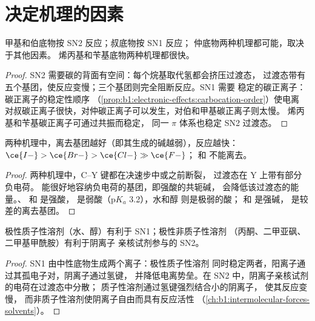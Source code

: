 \section{决定机理的因素}

\begin{proposition}[底物]\label{prop:b1:nucleophilic-substitution:substrate}
甲基和伯底物按 SN2 反应；叔底物按 SN1 反应；
仲底物两种机理都可能，取决于其他因素。
烯丙基和苄基底物两种机理都很快。
\end{proposition}

\begin{proof}
SN2 需要碳的背面有空间：每个烷基取代氢都会挤压过渡态，
过渡态带有五个基团，使反应变慢；三个基团则完全阻断反应。SN1 需要
稳定的碳正离子：碳正离子的稳定性顺序
（\cref{prop:b1:electronic-effects:carbocation-order}）使电离
对叔碳正离子很快，对仲碳正离子可以发生，对伯和甲基碳正离子则太慢。
烯丙基和苄基碳正离子可通过共振而稳定，
同一 $\pi$ 体系也稳定 SN2
过渡态。
\end{proof}

\begin{proposition}[离去基团]\label{prop:b1:nucleophilic-substitution:leaving-group}
两种机理中，离去基团越好（即其生成的碱越弱），反应越快：
$\ce{I-} > \ce{Br-} > \ce{Cl-} \gg \ce{F-}$；
 和  不能离去。
\end{proposition}

\begin{proof}
两种机理中，C--Y 键都在决速步中或之前断裂，
过渡态在 Y 上带有部分负电荷。
能很好地容纳负电荷的基团，即强酸的共轭碱，
会降低该过渡态的能量。、 和
 是强酸， 是弱酸（$\mathrm{p}K_a$ 3.2），水和醇
则是极弱的酸； 和  是强碱，
是较差的离去基团。
\end{proof}

\begin{proposition}[溶剂]\label{prop:b1:nucleophilic-substitution:solvent}
极性质子性溶剂（水、醇）有利于 SN1；极性非质子性溶剂
（丙酮、二甲亚砜、二甲基甲酰胺）有利于阴离子
亲核试剂参与的 SN2。
\end{proposition}

\begin{proof}
SN1 由中性底物生成两个离子：极性质子性溶剂
同时稳定两者，阳离子通过其孤电子对，阴离子通过氢键，
并降低电离势垒。在 SN2 中，阴离子亲核试剂的电荷在过渡态中分散；
质子性溶剂通过氢键强烈结合小的阴离子，
使其反应变慢，
而非质子性溶剂使阴离子自由而具有反应活性
（\cref{ch:b1:intermolecular-forces-solvents}）。
\end{proof}

